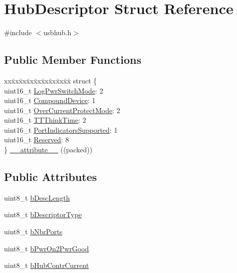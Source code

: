 \hypertarget{struct_hub_descriptor}{\section{\-Hub\-Descriptor \-Struct \-Reference}
\label{struct_hub_descriptor}
}


{\ttfamily \#include $<$usbhub.\-h$>$}

\subsection*{\-Public \-Member \-Functions}
\begin{DoxyCompactItemize}
\item 
\begin{tabbing}
xx\=xx\=xx\=xx\=xx\=xx\=xx\=xx\=xx\=\kill
struct \{\\
\>uint16\_t \hyperlink{struct_hub_descriptor_a68084f6fd86bff9598573ac845be6fe3}{LogPwrSwitchMode}: 2\\
\>uint16\_t \hyperlink{struct_hub_descriptor_a3547643d0dfd8f16145229c530a8c1a5}{CompoundDevice}: 1\\
\>uint16\_t \hyperlink{struct_hub_descriptor_a0ac02abaa7e8aeec5f1520a58c9eecb3}{OverCurrentProtectMode}: 2\\
\>uint16\_t \hyperlink{struct_hub_descriptor_a00002f5db3d923aa11645bfde3cd650e}{TTThinkTime}: 2\\
\>uint16\_t \hyperlink{struct_hub_descriptor_a6478c259c7397e89d50b42f6f3d4f4e4}{PortIndicatorsSupported}: 1\\
\>uint16\_t \hyperlink{struct_hub_descriptor_a0c3292fe67fdbdab6ceac8b198ef44bf}{Reserved}: 8\\
\} \hyperlink{struct_hub_descriptor_a91de06a105c2b40d9f60d0d42af29688}{\_\_attribute\_\_} ((packed))\\

\end{tabbing}\end{DoxyCompactItemize}
\subsection*{\-Public \-Attributes}
\begin{DoxyCompactItemize}
\item 
uint8\-\_\-t \hyperlink{struct_hub_descriptor_a8d761880b0fe752c395538bc0976f041}{b\-Desc\-Length}
\item 
uint8\-\_\-t \hyperlink{struct_hub_descriptor_a8f613e53b85930830679201aeb8a4024}{b\-Descriptor\-Type}
\item 
uint8\-\_\-t \hyperlink{struct_hub_descriptor_a8519ab446f0bdb69c33cd89b553da30b}{b\-Nbr\-Ports}
\item 
uint8\-\_\-t \hyperlink{struct_hub_descriptor_a670882df710639db15249ee9a956b664}{b\-Pwr\-On2\-Pwr\-Good}
\item 
uint8\-\_\-t \hyperlink{struct_hub_descriptor_a454ce905f8af25625156fbeb729d53b7}{b\-Hub\-Contr\-Current}
\end{DoxyCompactItemize}



